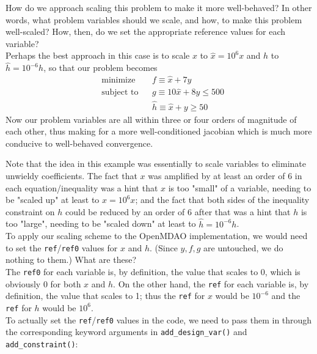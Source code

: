 \documentclass{article}
\begin{document}
How do we approach scaling this problem to make it more well-behaved? In other words, what problem variables should we scale, and how, to make this problem well-scaled? How, then, do we set the appropriate reference values for each variable? \\

Perhaps the best approach in this case is to scale $x$ to $\hat{x} = 10^6 x$ and $h$ to $\hat{h} = 10^{-6} h$, so that our problem becomes
\begin{equation*}
\begin{aligned}
& \text{minimize} & & f \equiv \hat{x} + 7 y \\
& \text{subject to} & & g \equiv 10 \hat{x} + 8 y \leq 500 \\
& & & \hat{h} \equiv \hat{x} + y \geq 50
\end{aligned}
\end{equation*}
Now our problem variables are all within three or four orders of magnitude of each other, thus making for a more well-conditioned jacobian which is much more conducive to well-behaved convergence.

Note that the idea in this example was essentially to scale variables to eliminate unwieldy coefficients. The fact that $x$ was amplified by at least an order of $6$ in each equation/inequality was a hint that $x$ is too "small" of a variable, needing to be "scaled up" at least to $\hat{x} = 10^6 x$; and the fact that both sides of the inequality constraint on $h$ could be reduced by an order of $6$ after that was a hint that $h$ is too "large", needing to be "scaled down" at least to $\hat{h} = 10^{-6} h$. \\

To apply our scaling scheme to the OpenMDAO implementation, we would need to set the \texttt{ref}/\texttt{ref0} values for $x$ and $h$. (Since $y,f,g$ are untouched, we do nothing to them.) What are these? \\

The \texttt{ref0} for each variable is, by definition, the value that scales to 0, which is obviously 0 for both $x$ and $h$. On the other hand, the \texttt{ref} for each variable is, by definition, the value that scales to 1; thus the \texttt{ref} for $x$ would be $10^{-6}$ and the \texttt{ref} for $h$ would be $10^6$. \\

To actually set the \texttt{ref}/\texttt{ref0} values in the code, we need to pass them in through the corresponding keyword arguments in \verb|add_design_var()| and \verb|add_constraint()|:
\end{document}
